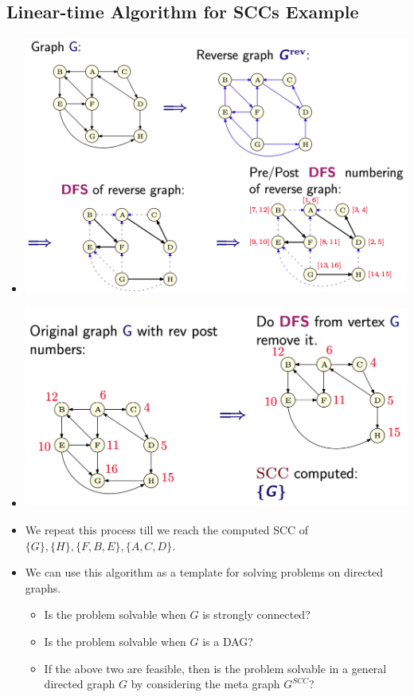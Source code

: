 \subsection{Linear-time Algorithm for SCCs Example}
\begin{itemize}
    \item[] \includegraphics[width=\textwidth]{lecture17/images/linear-scc-algorithm-visualization.jpg}
    \item[] \includegraphics[width=\textwidth]{lecture17/images/linear-scc-algorithm-visualization-2.jpg}
    \item We repeat this process till we reach the computed SCC of $\{ G \}, \{ H \}, \{ F, B, E \}, \{ A, C, D \}$.
    \item We can use this algorithm as a template for solving problems on directed graphs.
    \begin{itemize}
        \item Is the problem solvable when $G$ is strongly connected?
        \item Is the problem solvable when $G$ is a DAG?
        \item If the above two are feasible, then is the problem solvable in a general directed graph $G$ by considering the meta graph $G^{SCC}$?
    \end{itemize}
\end{itemize}

